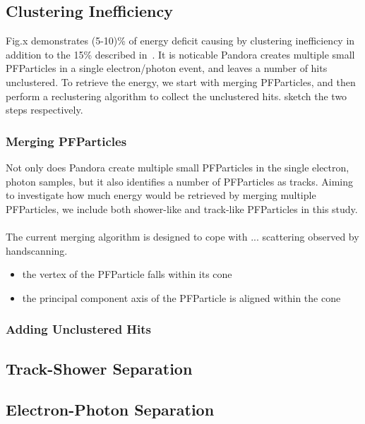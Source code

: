 \subsection{Clustering Inefficiency}
\label{sec:clustering_ineff}

Fig.x demonstrates (5-10)\% of energy deficit causing by clustering
inefficiency in addition to the 15\% described in~.
It is noticable Pandora creates multiple small PFParticles in 
a single electron/photon event, and leaves a number of hits unclustered.
To retrieve the energy, we start with merging PFParticles, and then
perform a reclustering algorithm to collect the unclustered hits.
 sketch the two steps respectively.

\subsubsection{Merging PFParticles}
\label{sec:merging}

Not only does Pandora create multiple small PFParticles in
the single electron, photon samples,
but it also identifies a number of PFParticles as tracks.
Aiming to investigate how much energy would be retrieved by merging
multiple PFParticles, we include both shower-like and track-like
PFParticles in this study.\\
\\
The current merging algorithm is designed to cope with ... scattering
observed by handscanning.

\begin{itemize}
\item the vertex of the PFParticle falls within its cone
\item the principal component axis of the PFParticle is aligned
      within the cone
\end{itemize}

\subsubsection{Adding Unclustered Hits}
\label{sec:adding_hits}

\subsection{Track-Shower Separation}

\subsection{Electron-Photon Separation}
